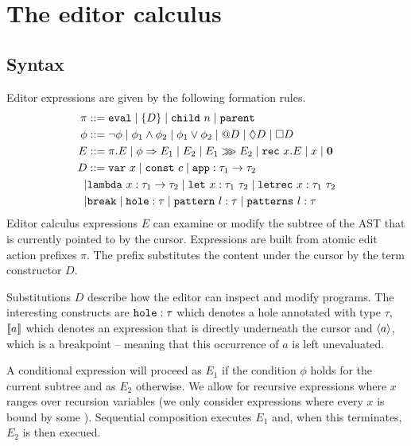 \section{The editor calculus}
\label{sec:editorcalculus}

\subsection{Syntax}

Editor expressions are given by the following formation rules.
%
\begin{align}
    \pi &::= \texttt{eval}
  \mid \{ D \}
  \mid \texttt{child}~n
  \mid \texttt{parent} \label{aep-formation-rules} \\
   \phi &::= \neg\phi
  \mid \phi_1 \land \phi_2
  \mid \phi_1 \lor \phi_2
  \mid @D
  \mid \Diamond D
  \mid \Box D \label{eed-formation-rules} \\
    E &::= \pi.E
  \mid \phi \Rightarrow E_1 \mid E_2
  \mid E_1 \ggg E_2
  \mid \texttt{rec}~x.E
  \mid x
  \mid \mathbf{0} \label{edt-formation-rules} \\
    D &::= \texttt{var}~x
  \mid \texttt{const}~c
  \mid \texttt{app} : \tau_1\to\tau_2\\
    \mid &\texttt{lambda}~x : \tau_1\to\tau_2
  \mid \texttt{let}~x : \tau_1~\tau_2
\mid \texttt{letrec}~x : \tau_1~\tau_2\\
    \mid &\texttt{break}
  \mid \texttt{hole} : \tau
  \mid\texttt{pattern}~l : \tau
  \mid\texttt{patterns}~l : \tau
\end{align}
%
Editor calculus expressions $E$ can examine or modify the subtree of the
AST that is currently pointed to by the cursor. Expressions are built
from atomic edit action prefixes $\pi$. The  prefix substitutes
the content under the cursor by the term constructor $D$.

Substitutions $D$ describe how the editor can
inspect and modify programs.
The interesting constructs are
$\texttt{hole} : \tau$ which denotes a hole annotated with type
$\tau$, $\llbracket a \rrbracket$ which denotes an expression that is directly
underneath the cursor and $\langle a \rangle$, which is a breakpoint --
meaning that this occurrence of $a$ is left unevaluated.

A conditional expression  will proceed as $E_1$
if the condition $\phi$ holds for the current subtree and as $E_2$
otherwise. We allow for recursive expressions  where $x$
ranges over recursion variables (we only consider expressions where
every $x$ is bound by some ). Sequential composition
 executes $E_1$ and, when this terminates, $E_2$ is
then execued.

